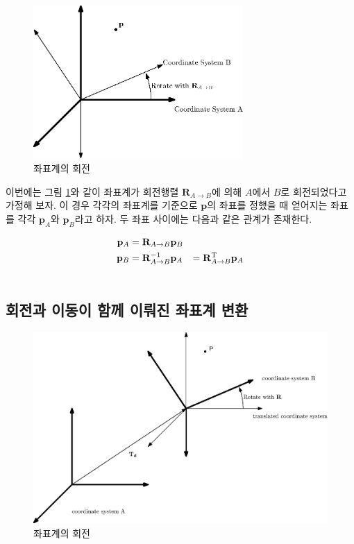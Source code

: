 \begin{figure}[h!]
  \centering
    \includegraphics[width=8cm]{Math_transform/coordinateRotate.eps}
    \caption{좌표계의 회전}
    \label{fig:transform:coordinateRotate}
\end{figure}


이번에는 그림 \ref{fig:transform:coordinateRotate}와 같이 좌표계가 회전행렬 $\mathbf R_{A \rightarrow B}$에 의해 $A$에서 $B$로 회전되었다고 가정해 보자.
이 경우 각각의 좌표계를 기준으로 $\mathbf p$의 좌표를 정했을 때 얻어지는 좌표를 각각 $\mathbf p_A$와 $\mathbf p_B$라고 하자.
두 좌표 사이에는 다음과 같은 관계가 존재한다.

\begin{eqnarray}
\mathbf p_A &= \mathbf R_{A \rightarrow B} \mathbf p_B &\\ \nonumber
\mathbf p_B &=  \mathbf R_{A \rightarrow B}^{-1} \mathbf p_A & =  \mathbf R_{A \rightarrow B}^{\rm T} \mathbf p_A  \\ \nonumber
\end{eqnarray}


\subsection{회전과 이동이 함께 이뤄진 좌표계 변환}

\begin{figure}[h!]
  \centering
    \includegraphics[width=12cm]{Math_transform/coordinateTransform.eps}
    \caption{좌표계의 회전}
    \label{fig:transform:coordinateTransform}
\end{figure}

